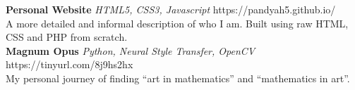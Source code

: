 \documentclass[a4paper]{article}
\begin{document}
{\textbf{Personal Website}} {\sl HTML5, CSS3, Javascript} \hfill https://pandyah5.github.io/\\
A more detailed and informal description of who I am. Built using raw HTML, CSS and PHP from scratch.\\
\vspace*{1mm}
{\textbf{Magnum Opus}} {\sl Python, Neural Style Transfer, OpenCV} \hfill https://tinyurl.com/8j9hs2hx\\
My personal journey of finding “art in mathematics” and “mathematics in art”.\\
\vspace*{2mm}
\end{document}

